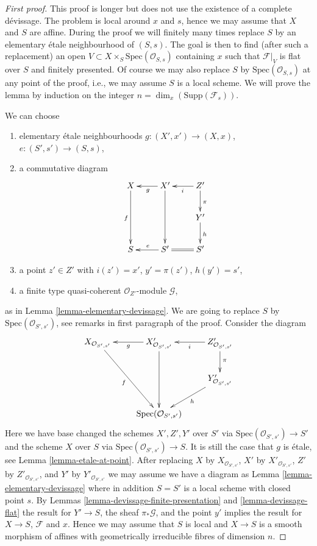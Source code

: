 \begin{proof}[First proof]
This proof is longer but does not use the existence of a complete d\'evissage.
The problem is local around $x$ and $s$, hence we may assume that $X$
and $S$ are affine. During the proof we will finitely many times replace
$S$ by an elementary \'etale neighbourhood of $(S, s)$. The goal is then to find
(after such a replacement) an open
$V \subset X \times_S \text{Spec}(\mathcal{O}_{S, s})$ containing $x$
such that $\mathcal{F}|_V$ is flat over $S$ and finitely presented.
Of course we may also replace $S$ by $\text{Spec}(\mathcal{O}_{S, s})$
at any point of the proof, i.e., we may assume $S$ is a local scheme.
We will prove the lemma by induction on the integer
$n = \dim_x(\text{Supp}(\mathcal{F}_s))$.

\medskip\noindent
We can choose
\begin{enumerate}
\item elementary \'etale neighbourhoods $g : (X', x') \to (X, x)$,
$e : (S', s') \to (S, s)$,
\item a commutative diagram
$$
\xymatrix{
X \ar[dd]_f & X' \ar[dd] \ar[l]^g & Z' \ar[l]^i \ar[d]^\pi \\
& & Y' \ar[d]^h \\
S & S' \ar[l]_e & S' \ar@{=}[l]
}
$$
\item a point $z' \in Z'$ with $i(z') = x'$, $y' = \pi(z')$, $h(y') = s'$,
\item a finite type quasi-coherent $\mathcal{O}_{Z'}$-module $\mathcal{G}$,
\end{enumerate}
as in
Lemma \ref{lemma-elementary-devissage}.
We are going to replace $S$ by $\text{Spec}(\mathcal{O}_{S', s'})$, see
remarks in first paragraph of the proof. Consider the diagram
$$
\xymatrix{
X_{\mathcal{O}_{S', s'}} \ar[ddr]_f &
X'_{\mathcal{O}_{S', s'}} \ar[dd] \ar[l]^g &
Z'_{\mathcal{O}_{S', s'}} \ar[l]^i \ar[d]^\pi \\
& & Y'_{\mathcal{O}_{S', s'}} \ar[dl]^h \\
& \text{Spec}(\mathcal{O}_{S', s'})
}
$$
Here we have base changed the schemes $X', Z', Y'$ over $S'$ via
$\text{Spec}(\mathcal{O}_{S', s'}) \to S'$ and the scheme $X$ over $S$ via
$\text{Spec}(\mathcal{O}_{S', s'}) \to S$. It is still the case that
$g$ is \'etale, see
Lemma \ref{lemma-etale-at-point}.
After replacing $X$ by $X_{\mathcal{O}_{S', s'}}$,
$X'$ by $X'_{\mathcal{O}_{S', s'}}$,
$Z'$ by $Z'_{\mathcal{O}_{S', s'}}$, and
$Y'$ by $Y'_{\mathcal{O}_{S', s'}}$
we may assume we have a diagram as
Lemma \ref{lemma-elementary-devissage}
where in addition $S = S'$ is a local scheme with closed point $s$. By
Lemmas \ref{lemma-devissage-finite-presentation} and
\ref{lemma-devissage-flat}
the result for $Y' \to S$, the sheaf $\pi_*\mathcal{G}$, and the
point $y'$ implies the result for $X \to S$, $\mathcal{F}$ and $x$.
Hence we may assume that $S$ is local and $X \to S$ is a smooth morphism
of affines with geometrically irreducible fibres of dimension $n$.


\end{proof}
